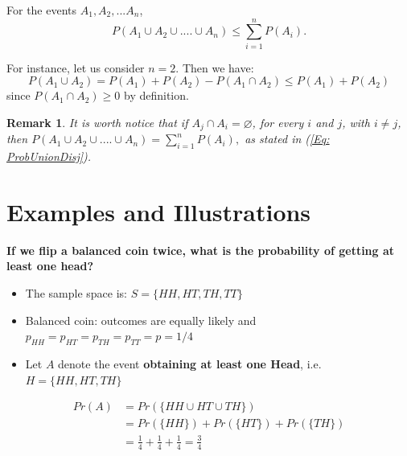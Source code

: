 \documentclass[notes=show, handout]{beamer}\usepackage[]{graphicx}\usepackage[]{color}
\newtheorem{remark}{Remark}[section]
\begin{document}
\begin{frame}{\secname}
  \begin{theorem} 
  For the events $A_1,A_2,... A_n$,
  $$
  P(A_1 \cup A_2 \cup....\cup A_n) \leq \sum_{i=1}^{n}P(A_i).
  $$
  \end{theorem}
  \vspace{0.1cm}
  For instance, let us consider $n=2$. Then we have:
  $$
  P(A_1 \cup A_2 ) = P(A_1) + P(A_2) - P(A_1 \cap A_2) \leq P(A_1) + P(A_2)
  $$
  since $P(A_1 \cap A_2) \geq 0$ by definition.
  \begin{remark}
  It is worth notice that if $A_j \cap A_i = \varnothing$, for every $i$ and $j$, with $i\neq j$, then
  $
  P(A_1 \cup A_2 \cup....\cup A_n) = \sum_{i=1}^{n}P(A_i),
  $
  as stated in (\ref{Eq: ProbUnionDisj}).
  \end{remark}
\end{frame}

\section{Examples and Illustrations}

\begin{frame}{\secname}
  \begin{example}
    \begin{footnotesize}
    \textbf{If we flip a balanced coin twice, {what is the probability of getting at least one head?}}

    \begin{itemize}
    \item The sample space is: $S = \{HH, HT, TH, TT\}$
    \item Balanced coin: outcomes are equally likely and $p_{HH} = p_{HT} = p_{TH} = p_{TT} = p = 1/4$
    \item Let $A$ denote the event \textbf{obtaining at least one Head}, i.e. $H = \{HH, HT, TH\}$
    \end{itemize}
    \begin{align*}
    Pr(A) &= Pr(\{HH \cup HT \cup TH\}) \\
          &= Pr(\{HH\}) +   Pr(\{HT\}) + Pr(\{TH\})\\
          &= \frac{1}{4} +\frac{1}{4}+\frac{1}{4} = \frac{3}{4}
    \end{align*}
    \end{footnotesize}
  \end{example}
\end{frame}
\end{document}
